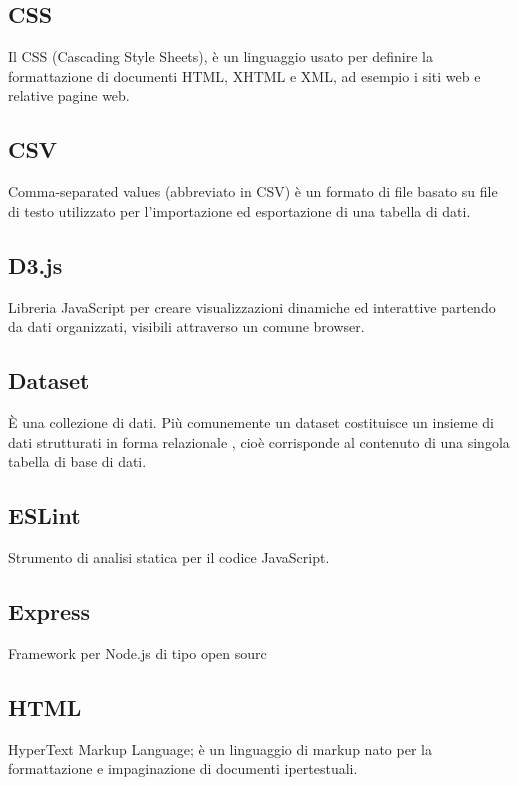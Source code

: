 \documentclass[../manuale_sviluppatore.tex]{subfiles}
\begin{document}
\subsection*{CSS}
{}
Il CSS (Cascading Style Sheets), è un linguaggio usato per definire la formattazione di documenti HTML, XHTML e XML, ad esempio i siti web e relative pagine web.

\subsection*{CSV}
{}
Comma-separated values (abbreviato in CSV) è un formato di file basato su file di testo utilizzato per l'importazione ed esportazione di una tabella di dati.

\subsection*{D3.js}
{}
Libreria JavaScript per creare visualizzazioni dinamiche ed interattive partendo da dati organizzati, visibili attraverso un comune browser.

\subsection*{Dataset}
{}
È una collezione di dati. Più comunemente un dataset costituisce un insieme di dati strutturati in forma relazionale , cioè corrisponde al contenuto di una singola tabella di base di dati.

\subsection*{ESLint}
{}
Strumento di analisi statica per il codice JavaScript.

\subsection*{Express}
{}
Framework per Node.js di tipo open sourc

\subsection*{HTML}
{}
HyperText Markup Language; è un linguaggio di markup nato per la formattazione e impaginazione di documenti ipertestuali.
\end{document}
